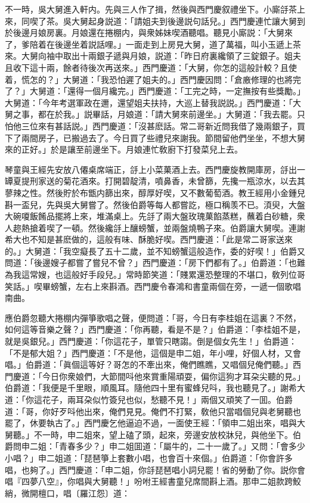 不一時，吳大舅進入軒内。先與三人作了揖，然後與西門慶叙禮坐下。小廝㧱茶上來，同喫了茶。吳大舅起身説道：「請姐夫到後邊説句話兒。」西門慶連忙讓大舅到於後邊月娘房裏。月娘還在捲棚内，與衆姊妹喫酒聽唱。聽見小廝説：「大舅來了，爹陪着在後邊坐着説話哩。」一面走到上房見大舅，道了萬福，叫小玉遞上茶來。大舅向袖中取出十兩銀子遞與月娘，説道：「昨日府裏纔領了三錠銀子。姐夫且收下這十兩，餘者待後次再送來。」西門慶道：「大舅，你怎的這般計較？且使着，慌怎的？」大舅道：「我恐怕遲了姐夫的。」西門慶因問：「倉廒修理的也將完了？」大舅道：「還得一個月纔完。」西門慶道：「工完之時，一定撫按有些獎勵。」大舅道：「今年考選軍政在邇，還望姐夫扶持，大巡上替我説説。」西門慶道：「大舅之事，都在於我。」説畢話，月娘道：「請大舅來前邊坐。」大舅道：「我去罷。只怕他三位來有甚話説。」西門慶道：「沒甚麽話。常二哥新近問我借了幾兩銀子，買下了兩間房子，已搬過去了。今日買了些禮兒來謝我。節間留他們坐坐，不想大舅來的正好。」於是讓至前邊坐下。月娘連忙敎廚下打發菜兒上去。

琴童與王經先安放八僊桌席端正，㧱上小菜菓酒上去。西門慶旋教開庫房，㧱出一罈夏提刑家送的菊花酒來。打開碧靛清，噴鼻香，未曾篩，先攙一瓶涼水，以去其蓼辣之性。然後貯於布甑内篩出來，醇厚好喫，又不數葡萄酒。教王經用小金鍾兒斟一盃兒，先與吳大舅嘗了。然後伯爵等每人都嘗訖，極口稱羡不已。湏臾，大盤大碗嗄飯餚品擺將上來，堆滿桌上。先㧱了兩大盤玫瑰菓餡蒸糕，蘸着白砂糖，衆人趂熱搶着喫了一頓。然後纔㧱上釀螃蟹，並兩盤燒鴨子來。伯爵讓大舅喫。連謝希大也不知是甚麽做的，這般有味、酥脆好喫。西門慶道：「此是常二哥家送來的。」大舅道：「我空癡長了五十二歲，並不知螃蟹這般造作，委的好喫！」伯爵又問道：「後邊嫂子都嘗了嘗兒不曾？」西門慶道：「房下們都有了。」伯爵道：「也難為我這常嫂，也這般好手段兒。」常時節笑道：「賤累還恐整理的不堪口，敎列位哥笑話。」喫畢螃蟹，左右上來斟酒。西門慶令春鴻和書童兩個在旁，一遞一個歌唱南曲。

應伯爵忽聽大捲棚内彈箏歌唱之聲，便問道：「哥，今日有李桂姐在這裏？不然，如何這等音樂之聲？」西門慶道：「你再聽，看是不是？」伯爵道：「李桂姐不是，就是吳銀兒。」西門慶道：「你這花子，單管只瞎謅。倒是個女先生！」伯爵道：「不是郁大姐？」西門慶道：「不是他，這個是申二姐，年小哩，好個人材，又會唱。」伯爵道：「眞個這等好？哥怎的不牽出來，俺們瞧瞧，又唱個兒俺們聽。」西門慶道：「今日你衆娘們，大節間呌他來賞重陽頑耍，偏你這狗才耳朶尖聽的見。」伯爵道：「我便是千里眼，順風耳。隨他四十里有蜜蜂兒呌，我也聽見了。」謝希大道：「你這花子，兩耳朶似竹簽兒也似，愁聽不見！」兩個又頑笑了一囬。伯爵道：「哥，你好歹呌他出來，俺們見見。俺們不打緊，敎他只當唱個兒與老舅聽也罷了，休要執古了。」西門慶乞他逼迫不過，一面使王經：「領申二姐出來，唱與大舅聽。」不一時，申二姐來，望上磕了頭，起來，旁邊安放校牀兒，與他坐下。伯爵問申二姐：「青春多少？」申二姐囬道：「屬牛的，二十一歲了。」又問：「會多少小唱？」申二姐道：「琵琶箏上套數小唱，也會百十來個。」伯爵道：「你會許多唱，也夠了。」西門慶道：「申二姐，你㧱琵琶唱小詞兒罷！省的勞動了你。説你會唱『四夢八空』，你唱與大舅聽！」吩咐王經書童兒席間斟上酒。那申二姐款跨鮫綃，微開檀口，唱〔羅江怨〕道：

